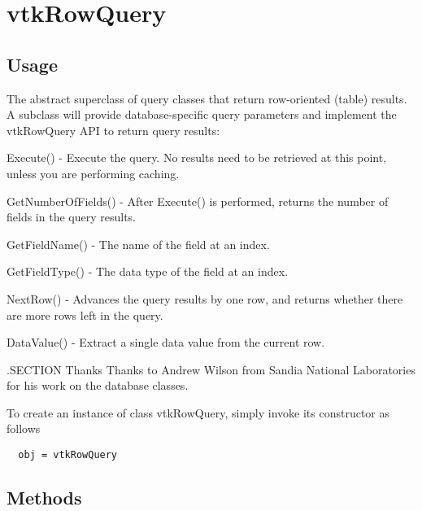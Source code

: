 \section{vtkRowQuery}

\subsection{Usage}

 The abstract superclass of query classes that return row-oriented (table)
 results.  A subclass will provide database-specific query parameters and
 implement the vtkRowQuery API to return query results:

 Execute() - Execute the query.  No results need to be retrieved at this
             point, unless you are performing caching.

 GetNumberOfFields() - After Execute() is performed, returns the number
                       of fields in the query results.

 GetFieldName() - The name of the field at an index.

 GetFieldType() - The data type of the field at an index.

 NextRow() - Advances the query results by one row, and returns whether
             there are more rows left in the query.

 DataValue() - Extract a single data value from the current row.

 .SECTION Thanks
 Thanks to Andrew Wilson from Sandia National Laboratories for his work
 on the database classes.


To create an instance of class vtkRowQuery, simply
invoke its constructor as follows
\begin{verbatim}
  obj = vtkRowQuery
\end{verbatim}
\subsection{Methods}

